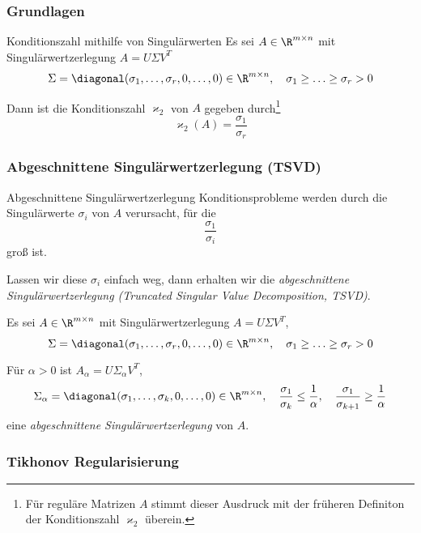 \subsubsection{Grundlagen}

\begin{defi}{Konditionszahl mithilfe von Singulärwerten}
    Es sei $A \in \R^{m \times n}$ mit Singulärwertzerlegung $A = U \Sigma V^T$
    \[
        \Sigma = \diagonal(\sigma_1, \ldots, \sigma_r, 0, \ldots, 0) \in \R^{m \times n}, \quad \sigma_1 \geq \ldots \geq \sigma_r > 0
    \]

    Dann ist die Konditionszahl $\varkappa_2$ von $A$ gegeben durch\footnote{Für reguläre Matrizen $A$ stimmt dieser Ausdruck mit der früheren Definiton der Konditionszahl $\varkappa_2$ überein.}
    \[
        \varkappa_2 (A) = \frac{\sigma_1}{\sigma_r}
    \]
\end{defi}

\subsubsection{Abgeschnittene Singulärwertzerlegung (TSVD)}

\begin{bonus}{Abgeschnittene Singulärwertzerlegung}
    Konditionsprobleme werden durch die Singulärwerte $\sigma_i$ von $A$ verursacht, für die
    \[
        \frac{\sigma_1}{\sigma_i}
    \]
    groß ist.

    Lassen wir diese $\sigma_i$ einfach weg, dann erhalten wir die \emph{abgeschnittene Singulärwertzerlegung (Truncated Singular Value Decomposition, TSVD)}.

    Es sei $A \in \R^{m \times n}$ mit Singulärwertzerlegung $A = U \Sigma V^T$,
    \[
        \Sigma = \diagonal(\sigma_1, \ldots, \sigma_r, 0, \ldots, 0) \in \R^{m \times n}, \quad \sigma_1 \geq \ldots \geq \sigma_r > 0
    \]

    Für $\alpha > 0$ ist $A_\alpha = U \Sigma_\alpha V^T$,
    \[
        \Sigma_\alpha = \diagonal(\sigma_1, \ldots, \sigma_k, 0, \ldots, 0) \in \R^{m \times n}, \quad \frac{\sigma_1}{\sigma_k} \leq \frac{1}{\alpha}, \quad \frac{\sigma_1}{\sigma_{k+1}} \geq \frac{1}{\alpha}
    \]
    eine \emph{abgeschnittene Singulärwertzerlegung} von $A$.
\end{bonus}

\subsubsection{Tikhonov Regularisierung}

